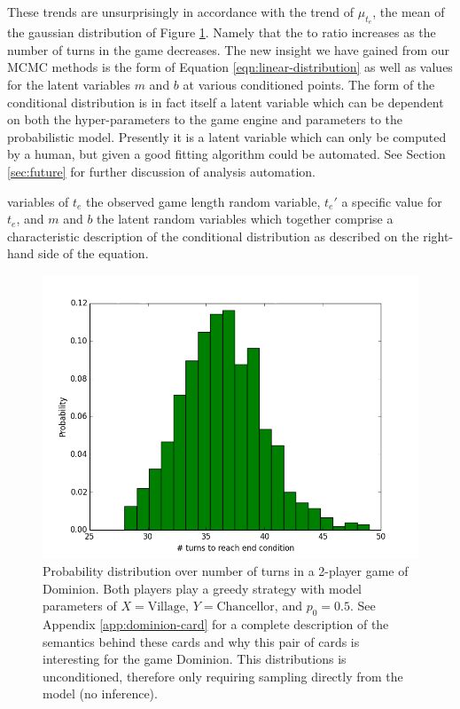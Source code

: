 These trends are unsurprisingly in accordance with the trend of $\mu_{t_e}$,
the mean of the gaussian distribution of Figure \ref{fig:turn-dist}. Namely
that the  to  ratio increases as the number of
turns in the game decreases. The new insight we have gained from our MCMC
methods is the form of Equation \ref{eqn:linear-distribution} as well as values
for the latent variables $m$ and $b$ at various conditioned points. The form
of the conditional distribution is in fact itself a latent variable which
can be dependent on both the hyper-parameters to the game engine and parameters
to the probabilistic model. Presently it is a latent variable which can only be
computed by a human, but given a good fitting algorithm could be automated.
See Section \ref{sec:future} for further discussion of analysis automation.

variables of $t_e$ the observed game
length random variable, $t_e'$ a specific value for $t_e$, and
$m$ and $b$ the latent random variables which together comprise
a characteristic description of the conditional distribution
as described on the right-hand side of the equation.


\begin{figure}
\includegraphics[width=.95\columnwidth]{../pres/village-chancellor-turn-dist.png}
\caption{\label{fig:turn-dist} Probability distribution over number of turns
in a 2-player game of Dominion.
Both players play a greedy strategy with model
parameters of $X = \textrm{Village}$, $Y = \textrm{Chancellor}$, and
$p_0 = 0.5$. See Appendix \ref{app:dominion-card} for a complete description
of the semantics behind these cards and why this pair of cards is interesting
for the game Dominion.
This distributions is unconditioned, therefore only requiring sampling directly
from the model (no inference).
}\end{figure}


